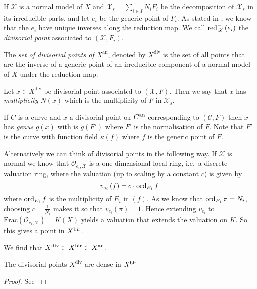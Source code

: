 If $\mathscr X$ is a normal model of $X$ and $\mathscr X_s = \sum_{i \in I} N_i F_i$ be the decomposition of $\mathscr X_s$ in its irreducible parts, and let $e_i$ be the generic point of $F_i$. 
As stated in \cite[thm 2.2.4]{berkovichSpectralTheoryAnalytic2012}, we know that the $e_i$ have unique inverses along the reduction map. 
We call $\operatorname{red}_{\mathscr X}^{-1}(e_i)$ the \emph{divisorial point} associated to $(\mathscr X, F_i)$.
\begin{definition}
	The \emph{set of divisorial points of $X^\mathrm{an}$}, denoted by  $X^{\text{div}}$ is the set of all points that are the inverse of a generic point of an irreducible component of a normal model of $X$ under the reduction map. 
\end{definition} 
\begin{definition}
	Let $x \in X^{\text{div}}$ be divisorial point associated to $(\mathscr X, F)$. 
	Then we say that $x$ has \emph{multiplicity} $N(x)$ which is the multiplicity of $F$ in $\mathscr X_s$. 
\end{definition}
\begin{definition}
	If $C$ is a curve and $x$ a divisorial point on $C{}^{\text{an}}$ corresponding to $(\mathscr C, F)$ then $x$ has \emph{genus} $g(x)$ with is $g(F')$ where $F'$ is the normalisation of $F$. 
	Note that $F'$ is the curve with function field  $\kappa(f)$ where $f$ is the generic point of $F$. 
\end{definition}
Alternatively we can think of divisorial points in the following way. 
If  $\mathscr X$ is normal we know that $\mathcal{O}_{e_i, \mathscr X}$ is a one-dimensional local ring, i.e.\ a discrete valuation ring, where the valuation (up to scaling by a constant $c$) is given by \[
	v_{e_i}\left( f \right)  = c\cdot \operatorname{ord}_{E_i} f
\] 
where $\operatorname{ord}_{E_i} f$ is the multiplicity of $E_i$ in $(f)$. 
As we know that  $\operatorname{ord}_{E_i} \pi = N_i$, choosing $c = \frac{1}{N_i}$ makes it so that $v_{e_i}(\pi) = 1$. 
Hence extending $v_{e_i}$ to $\mathrm{Frac}(\mathcal{O}_{e_i, \mathscr X}) = K(X)$ yields a valuation that extends the valuation on $K$. 
So this gives a point in $X{}^{\text{bir}}$. 

We find that $X^{\text{div}} \subset X{}^{\text{bir}} \subset X{}^{\text{an}}$. 
\begin{lemma}
	The divisorial points $X^{\text{div}}$ are dense in $X{}^{\text{bir}}$  
\end{lemma}
\begin{proof}
	See \cite[prop.\ 2.4.9]{mustataWeightFunctionsNonArchimedean2015}
\end{proof}

